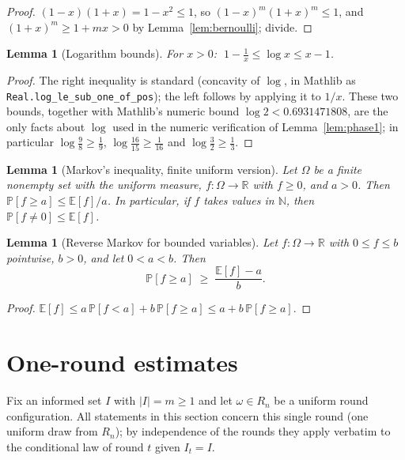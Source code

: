 \documentclass[11pt]{article}
\newtheorem{lemma}[theorem]{Lemma}
\newcommand{\E}{\mathbb{E}}
\renewcommand{\Pr}{\mathbb{P}}
\newcommand{\N}{\mathbb{N}}
\newcommand{\R}{\mathbb{R}}
\begin{document}
\begin{proof}
$(1-x)(1+x) = 1-x^2 \le 1$, so $(1-x)^m (1+x)^m \le 1$, and
$(1+x)^m \ge 1+mx > 0$ by Lemma~\ref{lem:bernoulli}; divide.
\end{proof}

\begin{lemma}[Logarithm bounds]\label{lem:logbounds}
For $x > 0$: $\;1 - \tfrac1x \le \log x \le x - 1$.
\end{lemma}

\begin{proof}
The right inequality is standard (concavity of $\log$, in Mathlib as
\texttt{Real.log\_le\_sub\_one\_of\_pos}); the left follows by applying it to
$1/x$.  These two bounds, together with Mathlib's numeric bound
$\log 2 < 0.6931471808$, are the only facts about $\log$ used in the numeric
verification of Lemma~\ref{lem:phase1}; in particular
$\log\tfrac98 \ge \tfrac19$, $\log\tfrac{16}{15} \ge \tfrac1{16}$ and
$\log\tfrac32 \ge \tfrac13$.
\end{proof}

\begin{lemma}[Markov's inequality, finite uniform version]\label{lem:markov}
Let $\Omega$ be a finite nonempty set with the uniform measure, $f \colon
\Omega \to \R$ with $f \ge 0$, and $a > 0$.  Then
$\Pr[f \ge a] \le \E[f]/a$.  In particular, if $f$ takes values in $\N$, then
$\Pr[f \ne 0] \le \E[f]$.
\end{lemma}

\begin{lemma}[Reverse Markov for bounded variables]\label{lem:revmarkov}
Let $f \colon \Omega \to \R$ with $0 \le f \le b$ pointwise, $b > 0$, and let
$0 < a < b$.  Then
\[
  \Pr[f \ge a] \;\ge\; \frac{\E[f] - a}{b}.
\]
\end{lemma}

\begin{proof}
$\E[f] \le a\,\Pr[f<a] + b\,\Pr[f\ge a] \le a + b\,\Pr[f \ge a]$.
\end{proof}

\section{One-round estimates}\label{sec:oneround}

Fix an informed set $I$ with $|I| = m \ge 1$ and let $\omega \in R_n$ be a
uniform round configuration.  All statements in this section concern this
single round (one uniform draw from $R_n$); by independence of the rounds they
apply verbatim to the conditional law of round $t$ given $I_t = I$.
\end{document}
